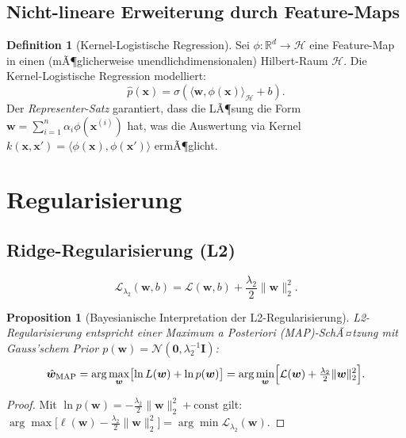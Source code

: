﻿\documentclass[12pt, a4paper]{article}
\newtheorem{proposition}[theorem]{Proposition}
\theoremstyle{definition}
\newtheorem{definition}[theorem]{Definition}
\theoremstyle{remark}
\newcommand{\R}{\mathbb{R}}
\newcommand{\sigmoid}{\sigma}
\newcommand{\vw}{\bm{w}}
\newcommand{\vx}{\bm{x}}
\begin{document}
\subsection{Nicht-lineare Erweiterung durch Feature-Maps}

\begin{definition}[Kernel-Logistische Regression]
  Sei $\phi: \R^d \to \mathcal{H}$ eine Feature-Map in einen (mÃ¶glicherweise unendlichdimensionalen)
  Hilbert-Raum $\mathcal{H}$. Die Kernel-Logistische Regression modelliert:
  \[
    \hat{p}(\vx) = \sigmoid(\langle\vw, \phi(\vx)\rangle_{\mathcal{H}} + b).
  \]
  Der \emph{Representer-Satz} garantiert, dass die LÃ¶sung die Form
  $\vw = \sum_{i=1}^n \alpha_i \phi(\vx^{(i)})$ hat, was die Auswertung via Kernel
  $k(\vx, \vx') = \langle\phi(\vx),\phi(\vx')\rangle$ ermÃ¶glicht.
\end{definition}

\section{Regularisierung}

\subsection{Ridge-Regularisierung (L2)}

\begin{equation}
  \mathcal{L}_{\lambda_2}(\vw, b) = \mathcal{L}(\vw,b) + \frac{\lambda_2}{2}\|\vw\|_2^2.
  \label{eq:l2_loss}
\end{equation}

\begin{proposition}[Bayesianische Interpretation der L2-Regularisierung]
  L2-Regularisierung entspricht einer \emph{Maximum a Posteriori} (MAP)-SchÃ¤tzung mit
  Gauss'schem Prior $p(\vw) = \mathcal{N}(\mathbf{0}, \lambda_2^{-1}\mathbf{I})$:
  \[
    \hat{\vw}_{\mathrm{MAP}} = \arg\max_{\vw} \bigl[\ln L(\vw) + \ln p(\vw)\bigr]
    = \arg\min_{\vw} \Bigl[\mathcal{L}(\vw) + \tfrac{\lambda_2}{2}\|\vw\|_2^2\Bigr].
  \]
\end{proposition}

\begin{proof}
  Mit $\ln p(\vw) = -\frac{\lambda_2}{2}\|\vw\|_2^2 + \mathrm{const}$ gilt:
  $\arg\max\bigl[\ell(\vw) - \frac{\lambda_2}{2}\|\vw\|_2^2\bigr] = \arg\min\mathcal{L}_{\lambda_2}(\vw)$. 
\end{proof}
\end{document}
